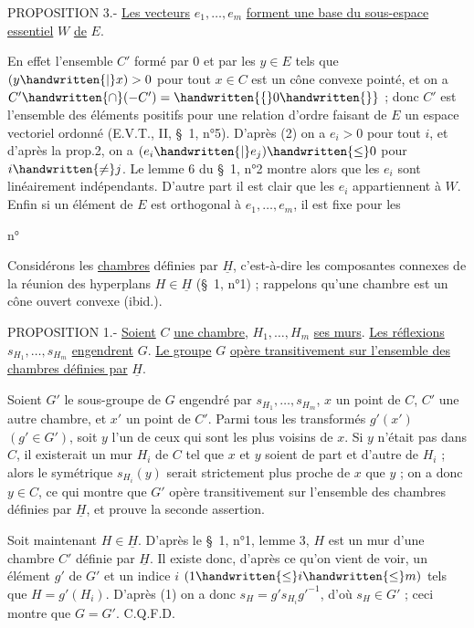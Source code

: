 PROPOSITION 3.- \uline{Les vecteurs} $e_1,\ldots,e_m$ \uline{forment une base du sous-espace essentiel} $W$ \uline{de} $E$.

En effet l'ensemble $C'$ formé par $0$ et par les $y\in E$ tels que $(y\handwritten{|}x)>0$ pour tout $x\in C$ est un cône convexe pointé, et on a $C'\handwritten{\cap}(-C')=\handwritten{\{}0\handwritten{\}}$ ; donc $C'$ est l'ensemble des éléments positifs pour une relation d'ordre faisant de $E$ un espace vectoriel ordonné (E.V.T., II, \S\ 1, n°5). D'après (2) on a $e_i>0$ pour tout $i$, et d'après la prop.2, on a $(e_i\handwritten{|}e_j)\handwritten{\leq}0$ pour $i\handwritten{\ne}j$. Le lemme 6 du \S\ 1, n°2 montre alors que les $e_i$ sont linéairement indépendants. D'autre part il est clair que les $e_i$ appartiennent à $W$. Enfin si un élément de $E$ est orthogonal à $e_1,\ldots,e_m$, il est fixe pour les
\begin{flushright}n°\end{flushright}
Considérons les \uline{chambres} définies par $\underline{H}$, c'est-à-dire les composantes connexes de la réunion des hyperplans $H\in\underline{H}$ (\S\ 1, n°1) ; rappelons qu'une chambre est un cône ouvert convexe (ibid.).

PROPOSITION 1.- \uline{Soient} $C$ \uline{une chambre}, $H_1,\ldots,H_m$ \uline{ses murs}. \uline{Les réflexions} $s_{H_1},\ldots,s_{H_m}$ \uline{engendrent} $G$. \uline{Le groupe} $G$ \uline{opère transitivement sur l'ensemble des chambres définies par} $\underline{H}$.

Soient $G'$ le sous-groupe de $G$ engendré par $s_{H_1},\ldots,s_{H_m}$, $x$ un point de $C$, $C'$ une autre chambre, et $x'$ un point de $C'$. Parmi tous les transformés $g'(x')$ $(g'\in G')$, soit $y$ l'un de ceux qui sont les plus voisins de $x$. Si $y$ n'était pas dans $C$, il existerait un mur $H_i$ de $C$ tel que $x$ et $y$ soient de part et d'autre de $H_i$ ; alors le symétrique $s_{H_i}(y)$ serait strictement plus proche de $x$ que $y$ ; on a donc $y\in C$, ce qui montre que $G'$ opère transitivement sur l'ensemble des chambres définies par $\underline{H}$, et prouve la seconde assertion.

Soit maintenant $H\in\underline{H}$. D'après le \S\ 1, n°1, lemme 3, $H$ est un mur d'une chambre $C'$ définie par $\underline{H}$. Il existe donc, d'après ce qu'on vient de voir, un élément $g'$ de $G'$ et un indice $i$ $(1\handwritten{\leq}i\handwritten{\leq}m)$ tels que $H=g'(H_i)$. D'après (1) on a donc $s_H=g's_{H_i}{g'}^{-1}$, d'où $s_H\in G'$ ; ceci montre que $G=G'$. C.Q.F.D.


